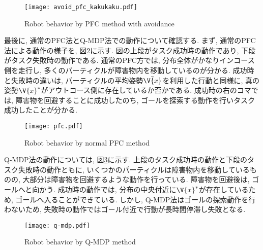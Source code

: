 \begin{figure}[h]
  \begin{center}
    \texttt{[image: avoid\_pfc\_kakukaku.pdf]}
    \caption{Robot behavior by PFC method with avoidance}
    \label{fig:avoid pfc kakukaku}
  \end{center}
\end{figure}

最後に, 通常のPFC法とQ-MDP法での動作について確認する. 
まず, 通常のPFC法による動作の様子を, 図\ref{fig:pfc}に示す. 
図の上段がタスク成功時の動作であり, 下段がタスク失敗時の動作である. 
通常のPFC方では, 分布全体がかなりインコース側を走行し, 多くのパーティクルが障害物内を移動しているのが分かる. 
成功時と失敗時の違いは, パーティクルの平均姿勢$\bar{\V{x}}$を利用した行動と同様に, 真の姿勢$\V{x}^{*}$がアウトコース側に存在しているか否かである. 
成功時の右のコマでは, 障害物を回避することに成功したのち, ゴールを探索する動作を行いタスク成功したことが分かる. 

\begin{figure}[h]
  \begin{center}
    \texttt{[image: pfc.pdf]}
    \caption{Robot behavior by normal PFC method}
    \label{fig:pfc}
  \end{center}
\end{figure}

Q-MDP法の動作については, 図\ref{fig:q-mdp}に示す. 
上段のタスク成功時の動作と下段のタスク失敗時の動作ともに, いくつかのパーティクルは障害物内を移動しているものの, 
大部分は障害物を回避するような動作を行っている. 
障害物を回避後は, ゴールへと向かう. 
成功時の動作では, 分布の中央付近に$\V{x}^{*}$が存在しているため, ゴールへ入ることができている. 
しかし, Q-MDP法はゴールの探索動作を行わないため, 失敗時の動作ではゴール付近で行動が長時間停滞し失敗となる. 

\begin{figure}[h]
  \begin{center}
    \texttt{[image: q-mdp.pdf]}
    \caption{Robot behavior by Q-MDP method}
    \label{fig:q-mdp}
  \end{center}
\end{figure}

